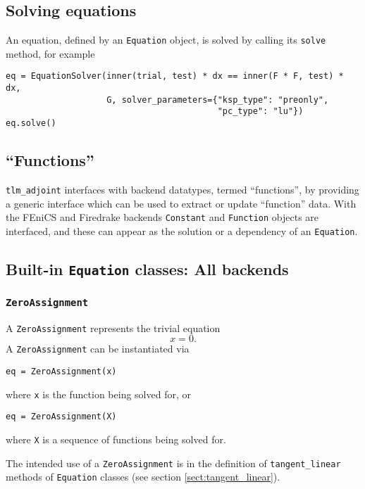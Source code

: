 \documentclass[11pt]{article}
\begin{document}
\subsection{Solving equations}

An equation, defined by an \texttt{Equation} object, is solved by calling its
\texttt{solve} method, for example
\begin{lstlisting}
eq = EquationSolver(inner(trial, test) * dx == inner(F * F, test) * dx,
                    G, solver_parameters={"ksp_type": "preonly",
                                          "pc_type": "lu"})
eq.solve()
\end{lstlisting}

\subsection{``Functions''}

\texttt{tlm\_adjoint} interfaces with backend datatypes, termed ``functions'',
by providing a generic interface which can be used to extract or update
``function'' data. With the FEniCS and Firedrake backends \texttt{Constant} and
\texttt{Function} objects are interfaced, and these can appear as the solution
or a dependency of an \texttt{Equation}.

\subsection{Built-in \texttt{Equation} classes: All backends}

\subsubsection{\texttt{ZeroAssignment}}

A \texttt{ZeroAssignment} represents the trivial equation
\begin{equation*}
  x = 0.
\end{equation*}
A \texttt{ZeroAssignment} can be instantiated via
\begin{lstlisting}
eq = ZeroAssignment(x)
\end{lstlisting}
where \texttt{x} is the function being solved for, or
\begin{lstlisting}
eq = ZeroAssignment(X)
\end{lstlisting}
where \texttt{X} is a sequence of functions being solved for.

The intended use of a \texttt{ZeroAssignment} is in the definition of
\texttt{tangent\_linear} methods of \texttt{Equation} classes (see section
\ref{sect:tangent_linear}).
\end{document}
